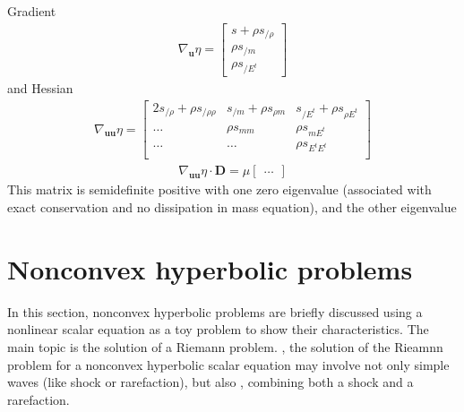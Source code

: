 \documentclass[letterpaper,10pt,english]{jupyterBook}
\begin{document}
\sphinxAtStartPar
{} Gradient
\begin{equation*}
\begin{split}\nabla_{\mathbf{u}} \eta = \begin{bmatrix} s + \rho s_{/\rho} \\ \rho s_{/m} \\ \rho s_{/E^t} \end{bmatrix}\end{split}
\end{equation*}
\sphinxAtStartPar
and Hessian
\begin{equation*}
\begin{split}\nabla_{\mathbf{u} \mathbf{u}} \eta = 
\begin{bmatrix}
2 s_{/\rho} + \rho s_{/\rho \rho} & s_{/m} + \rho s_{\rho m} &  s_{/E^t} + \rho s_{\rho E^t} \\
                           \dots  &          \rho s_{m    m} &             \rho s_{m    E^t} \\
                           \dots  &          \dots           &             \rho s_{E^t  E^t} \\
\end{bmatrix}
\end{split}
\end{equation*}
\sphinxAtStartPar
{}
\begin{equation*}
\begin{split}
\nabla_{\mathbf{u} \mathbf{u}} \eta \cdot \mathbf{D} = 
\mu \begin{bmatrix} \dots \end{bmatrix}
\end{split}
\end{equation*}
\sphinxAtStartPar
This matrix is semi\sphinxhyphen{}definite positive with one zero eigenvalue (associated with exact conservation and no dissipation in mass equation), and the other eigenvalue

\sphinxstepscope


\section{Non\sphinxhyphen{}convex hyperbolic problems}
\label{\detokenize{ch/pde/hyperbolic-non-convex:non-convex-hyperbolic-problems}}\label{\detokenize{ch/pde/hyperbolic-non-convex:pdf-hyperbolic-non-convex}}\label{\detokenize{ch/pde/hyperbolic-non-convex::doc}}
\sphinxAtStartPar
In this section, non\sphinxhyphen{}convex hyperbolic problems are briefly discussed using a non\sphinxhyphen{}linear scalar equation as a toy problem to show their characteristics. The main topic is the solution of a Riemann problem. , the solution of the Rieamnn problem for a non\sphinxhyphen{}convex hyperbolic scalar equation may involve not only simple waves (like shock or rarefaction), but also , combining both a shock and a rarefaction.
\end{document}

